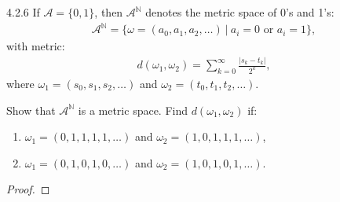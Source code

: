 \begin{problem}{4.2.6}
  If $\mathcal{A}= \{0, 1\}$, then $\mathcal{A}^\mathbb{N}$ denotes the metric
  space of 0's and 1's:
  \begin{align*}
    \mathcal{A}^\mathbb{N} = \{\omega = (a_0, a_1, a_2, \dots) \ |\ \text{$a_i = 0$ or $a_i = 1$}\},
  \end{align*}
  with metric:
  \begin{align*}
    d(\omega_1, \omega_2) = \sum_{k=0}^\infty\frac{|s_k - t_k|}{2^k},
  \end{align*}
  where $\omega_1 = (s_0, s_1, s_2, \dots)$ and $\omega_2 = (t_0, t_1, t_2, \dots)$.

  Show that $\mathcal{A}^\mathbb{N}$ is a metric space. Find $d(\omega_1, \omega_2)$ if:
  \begin{enumerate}
    \item $\omega_1 = (0, 1, 1, 1, 1, \dots)$ and $\omega_2 = (1, 0, 1, 1, 1, \dots )$,
    \item $\omega_1 = (0, 1, 0, 1, 0, \dots)$ and $\omega_2 = (1, 0, 1, 0, 1, \dots )$.
  \end{enumerate}
\end{problem}

\begin{proof}
\end{proof}
\newpage
